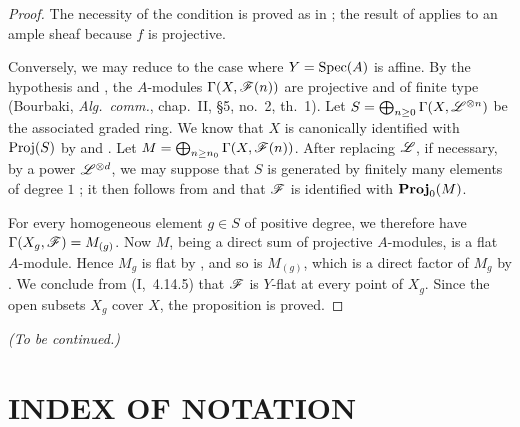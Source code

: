 \begin{proof}
The necessity of the condition is proved as in
; the result of  applies
to an ample sheaf because $f$ is projective.

Conversely, we may reduce to the case where
$Y=\operatorname{Spec}(A)$ is affine.  By the hypothesis and
, the $A$-modules
$\Gamma(X,\mathscr{F}(n))$ are projective and of finite type
(Bourbaki, \emph{Alg.~comm.}, chap.~II, \S5, no.~2,
th.~1).  Let $S=\bigoplus_{n\geq0}\Gamma(X,\mathscr{L}^{\otimes n})$
be the associated graded ring.  We know that $X$ is
canonically identified with $\operatorname{Proj}(S)$ by
 and .  Let $M=\bigoplus_{n\geq n_0}\Gamma(X,\mathscr{F}(n))$.
After replacing $\mathscr{L}$, if necessary, by a power
$\mathscr{L}^{\otimes d}$, we may suppose that $S$ is
generated by finitely many elements of degree $1$
; it then follows from
 and  that $\mathscr{F}$ is
identified with $\operatorname{\mathbf{Proj}}_0(M)$.

For every homogeneous element $g\in S$ of positive
degree, we therefore have $\Gamma(X_g,\mathscr{F})=M_{(g)}$.
Now $M$, being a direct sum of projective $A$-modules, is
a flat $A$-module.  Hence $M_g$ is flat by
, and so is $M_{(g)}$, which is a direct
factor of $M_g$ by .  We conclude from
(I,~4.14.5) that $\mathscr{F}$ is $Y$-flat at every
point of $X_g$.  Since the open subsets $X_g$ cover $X$,
the proposition is proved.
\end{proof}

\bigskip
\noindent\emph{(To be continued.)}

\clearpage
{}
\section*{INDEX OF NOTATION}


